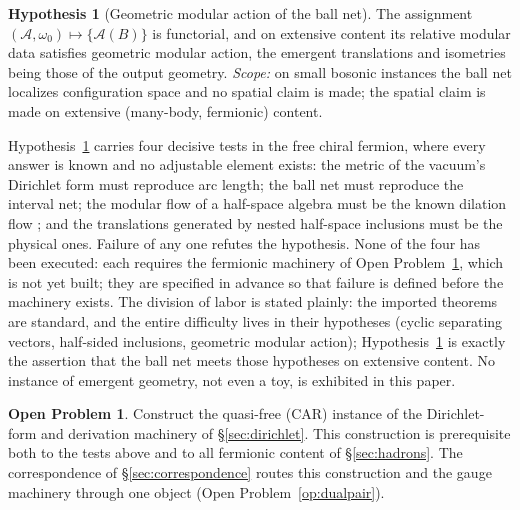 \documentclass[11pt]{article}
\theoremstyle{definition}
\newtheorem{hypothesis}[theorem]{Hypothesis}
\newtheorem{openproblem}[theorem]{Open Problem}
\theoremstyle{remark}
\newcommand{\A}{\mathcal{A}}
\newcommand{\w}{\omega_0}
\begin{document}
\begin{hypothesis}[Geometric modular action of the ball net]
\label{hyp:gma}
The assignment $(\A,\w) \mapsto \{\A(B)\}$ is functorial, and on
extensive content its relative modular data satisfies geometric modular
action, the emergent translations and isometries being those of the
output geometry.  \emph{Scope:} on small bosonic instances the ball net
localizes configuration space and no spatial claim is made; the spatial
claim is made on extensive (many-body, fermionic) content.
\end{hypothesis}

Hypothesis~\ref{hyp:gma} carries four decisive tests in the free chiral
fermion, where every answer is known and no adjustable element exists:
the metric of the vacuum's Dirichlet form must reproduce arc length; the
ball net must reproduce the interval net; the modular flow of a
half-space algebra must be the known dilation flow \cite{bisognano}; and
the translations generated by nested half-space inclusions
\cite{wiesbrock} must be the physical ones.  Failure of any one refutes
the hypothesis.  None of the four has been executed: each requires the
fermionic machinery of Open Problem~\ref{op:car}, which is not yet
built; they are specified in advance so that failure is defined before
the machinery exists.  The division of labor is stated plainly: the
imported theorems are standard, and the entire difficulty lives in
their hypotheses (cyclic separating vectors, half-sided inclusions,
geometric modular action); Hypothesis~\ref{hyp:gma} is exactly the
assertion that the ball net meets those hypotheses on extensive
content.  No instance of emergent geometry, not even a toy, is
exhibited in this paper.

\begin{openproblem}\label{op:car}
Construct the quasi-free (CAR) instance of the Dirichlet-form and
derivation machinery of \S\ref{sec:dirichlet}.  This construction is
prerequisite both to the tests above and to all fermionic content of
\S\ref{sec:hadrons}.  The correspondence of \S\ref{sec:correspondence}
routes this construction and the gauge machinery through one object
(Open Problem~\ref{op:dualpair}).
\end{openproblem}
\end{document}
